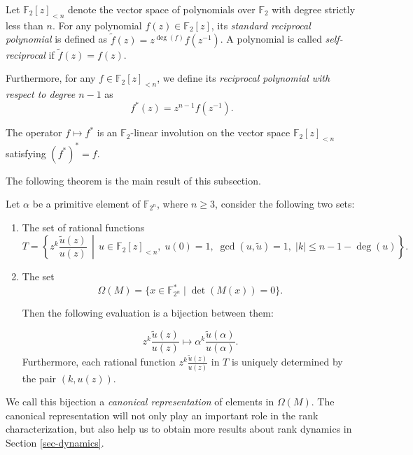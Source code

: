 \documentclass[hidelinks,onefignum,onetabnum]{siamart251216}
\theoremstyle{definition}
\theoremstyle{remark}
\begin{document}
\begin{definition}
	Let $\mathbb{F}_2[z]_{<n}$ denote the vector space of polynomials over $\mathbb{F}_2$ with degree strictly less than $n$. 
	For any polynomial $f(z) \in \mathbb{F}_2[z]$, its \textit{standard reciprocal polynomial} is defined as $\tilde{f}(z) = z^{\deg(f)} f(z^{-1})$. A polynomial is called \textit{self-reciprocal} if $\tilde{f}(z) = f(z)$.
	
	Furthermore, for any $f \in \mathbb{F}_2[z]_{<n}$, we define its \textit{reciprocal polynomial with respect to degree $n-1$} as
	\begin{equation}
		f^*(z) = z^{n-1} f(z^{-1}).
	\end{equation}
	
	The operator $f \mapsto f^*$ is an $\mathbb{F}_2$-linear involution on the vector space $\mathbb{F}_2[z]_{<n}$ satisfying $(f^*)^* = f$. 
\end{definition}

The following theorem is the main result of this subsection.



\begin{theorem}\label{thm-bij}
	Let $\alpha$ be a primitive element of $\mathbb{F}_{2^{n}}$, where $n\ge 3$, consider the following two sets: 
	\begin{enumerate}
		
		
		
		\item The set of rational functions \[
		T=
		\left\{
		z^k\frac{\widetilde{u}(z)}{u(z)}
		\,\middle|\,
		u\in \mathbb F_2[z]_{<n},\;
		u(0)=1,\;
		\gcd(u,\widetilde{u})=1,\;
		|k|\le n-1-\deg(u)
		\right\}.
		\]
		
		\item The set  $$\Omega (M)=\{ x\in\mathbb F_{2^n}^*\mid \det (M(x))=0\}.$$
		
		
	Then the following evaluation is a bijection between them:
		
		$$z^k\frac{\widetilde{u}(z)}{u(z)} \longmapsto \alpha^k\frac{\widetilde{u}(\alpha)}{u(\alpha)}.$$ Furthermore, each rational function $z^k\displaystyle\frac{\widetilde{u}(z)}{u(z)}$ in $T$ is uniquely determined by the pair $(k,u(z))$. 
	\end{enumerate}
\end{theorem}

We call this bijection a \textit{canonical  representation} of elements in $\Omega (M)$. The canonical representation will not only play an important role in the rank characterization, but also help us to obtain more results about rank dynamics in Section \ref{sec-dynamics}.
\end{document}
